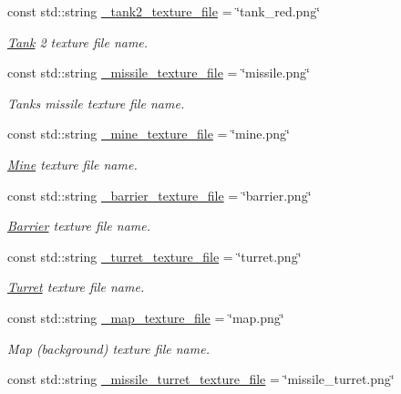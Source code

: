 \begin{DoxyCompactItemize}
const std\-::string \hyperlink{classDisplay_a5ab9e2102af414ee9d1d8d5b090ad9da}{\-\_\-tank2\-\_\-texture\-\_\-file} = \char`\"{}tank\-\_\-red.\-png\char`\"{}
\begin{DoxyCompactList}\small\item\em \hyperlink{classTank}{Tank} 2 texture file name. \end{DoxyCompactList}\item 
const std\-::string \hyperlink{classDisplay_a11a966967d1bfa745d910f25da35b6fb}{\-\_\-missile\-\_\-texture\-\_\-file} = \char`\"{}missile.\-png\char`\"{}
\begin{DoxyCompactList}\small\item\em Tanks missile texture file name. \end{DoxyCompactList}\item 
const std\-::string \hyperlink{classDisplay_a9b6a965f2d1ca97d9c243d4bbd941994}{\-\_\-mine\-\_\-texture\-\_\-file} = \char`\"{}mine.\-png\char`\"{}
\begin{DoxyCompactList}\small\item\em \hyperlink{classMine}{Mine} texture file name. \end{DoxyCompactList}\item 
const std\-::string \hyperlink{classDisplay_af921ed4131e5d5763e76ea7c54c3fea8}{\-\_\-barrier\-\_\-texture\-\_\-file} = \char`\"{}barrier.\-png\char`\"{}
\begin{DoxyCompactList}\small\item\em \hyperlink{classBarrier}{Barrier} texture file name. \end{DoxyCompactList}\item 
const std\-::string \hyperlink{classDisplay_a1e2dc0b7ef570f4584b7f171330a209d}{\-\_\-turret\-\_\-texture\-\_\-file} = \char`\"{}turret.\-png\char`\"{}
\begin{DoxyCompactList}\small\item\em \hyperlink{classTurret}{Turret} texture file name. \end{DoxyCompactList}\item 
const std\-::string \hyperlink{classDisplay_ac3bdb11a00913038ceeee3171fa99ea3}{\-\_\-map\-\_\-texture\-\_\-file} = \char`\"{}map.\-png\char`\"{}
\begin{DoxyCompactList}\small\item\em Map (background) texture file name. \end{DoxyCompactList}\item 
const std\-::string \hyperlink{classDisplay_a4d984df72ac348f13c50357bc58ad797}{\-\_\-missile\-\_\-turret\-\_\-texture\-\_\-file} = \char`\"{}missile\-\_\-turret.\-png\char`\"{}

\end{DoxyCompactItemize}
